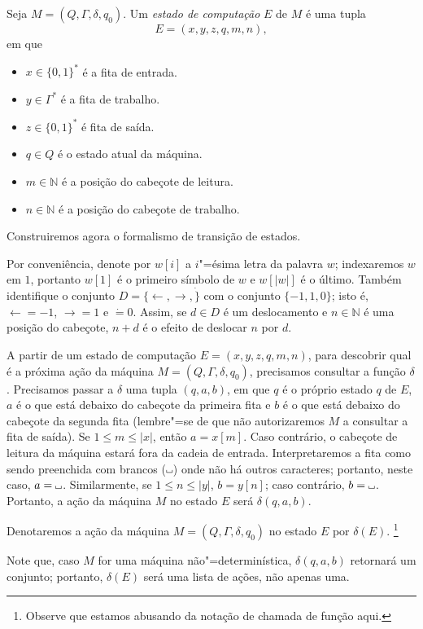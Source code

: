 \begin{definition}
    Seja $M = (Q, \Gamma, \delta, q_0)$.
    Um \emph{estado de computação} $E$ de $M$ é uma tupla
    \begin{equation*}
        E = (x, y, z, q, m, n),
    \end{equation*}
    em que
    \begin{itemize}
        \setlength{\labelsep}{1ex}
        \item $x \in \{0, 1\}^*$ é a fita de entrada.
        \item $y \in \Gamma^*$ é a fita de trabalho.
        \item $z \in \{0, 1\}^*$ é fita de saída.
        \item $q \in Q$ é o estado atual da máquina.
        \item $m \in \mathbb N$ é a posição do cabeçote de leitura.
        \item $n \in \mathbb N$ é a posição do cabeçote de trabalho.
    \end{itemize}
\end{definition}

Construiremos agora o formalismo de transição de estados.

Por conveniência, denote por $w[i]$ a $i$"=ésima letra da palavra $w$;
indexaremos $w$ em $1$,
portanto $w[1]$ é o primeiro símbolo de $w$ e $w[|w|]$ é o último.
Também identifique o conjunto $D = \{\leftarrow, \rightarrow, \dot\}$
com o conjunto $\{-1, 1, 0\}$;
isto é, $\leftarrow = -1$, $\rightarrow = 1$ e $\dot = 0$.
Assim, se $d \in D$ é um deslocamento
e $n \in \mathbb N$ é uma posição do cabeçote,
$n + d$ é o efeito de deslocar $n$ por $d$.

A partir de um estado de computação $E = (x, y, z, q, m, n)$,
para descobrir qual é a próxima ação da máquina $M = (Q, \Gamma, \delta, q_0)$,
precisamos consultar a função $\delta$.
Precisamos passar a $\delta$ uma tupla $(q, a, b)$,
em que $q$ é o próprio estado $q$ de $E$,
$a$ é o que está debaixo do cabeçote da primeira fita
e $b$ é o que está debaixo do cabeçote da segunda fita
(lembre"=se de que não autorizaremos $M$ a consultar a fita de saída).
Se $1 \leq m \leq |x|$,
então $a = x[m]$.
Caso contrário, o cabeçote de leitura da máquina
estará fora da cadeia de entrada.
Interpretaremos a fita como sendo preenchida com brancos ($\B$)
onde não há outros caracteres;
portanto, neste caso, $a = \B$.
Similarmente, se $1 \leq n \leq |y|$, $b = y[n]$; caso contrário, $b = \B$.
Portanto,
a ação da máquina $M$ no estado $E$
será $\delta(q, a, b)$.
\begin{notation}
    Denotaremos a ação da máquina $M = (Q, \Gamma, \delta, q_0)$
    no estado $E$ por $\delta(E)$.%
    \footnote{
        Observe que estamos abusando da notação de chamada de função aqui.
    }
\end{notation}
Note que,
caso $M$ for uma máquina não"=determinística,
$\delta(q, a, b)$ retornará um conjunto;
portanto, $\delta(E)$ será uma lista de ações,
não apenas uma.

